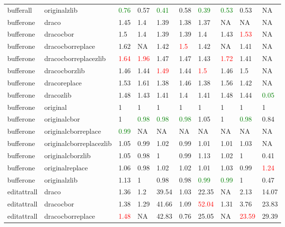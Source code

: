 \begin{landscape}
\begin{longtable}{llllllllll}
bufferall & originalzlib & \textcolor{green}{0.76} & 0.57 & \textcolor{green}{0.41} & 0.58 & \textcolor{green}{0.39} & \textcolor{green}{0.53} & 0.53 & NA\\
bufferone & draco & 1.45 & 1.4 & 1.39 & 1.38 & 1.37 & NA & NA & NA\\
bufferone & dracocbor & 1.5 & 1.4 & 1.39 & 1.39 & 1.4 & 1.43 & \textcolor{red}{1.53} & NA\\
bufferone & dracocborreplace & 1.62 & NA & 1.42 & \textcolor{red}{1.5} & 1.42 & NA & 1.41 & NA\\
bufferone & dracocborreplacezlib & \textcolor{red}{1.64} & \textcolor{red}{1.96} & 1.47 & 1.47 & 1.43 & \textcolor{red}{1.72} & 1.41 & NA\\
bufferone & dracocborzlib & 1.46 & 1.44 & \textcolor{red}{1.49} & 1.44 & \textcolor{red}{1.5} & 1.46 & 1.5 & NA\\
bufferone & dracoreplace & 1.53 & 1.61 & 1.38 & 1.46 & 1.38 & 1.56 & 1.42 & NA\\
bufferone & dracozlib & 1.48 & 1.43 & 1.41 & 1.4 & 1.41 & 1.48 & 1.44 & \textcolor{green}{0.05}\\
bufferone & original & 1 & 1 & 1 & 1 & 1 & 1 & 1 & 1\\
bufferone & originalcbor & 1 & \textcolor{green}{0.98} & \textcolor{green}{0.98} & \textcolor{green}{0.98} & 1.05 & 1 & \textcolor{green}{0.98} & 0.84\\
bufferone & originalcborreplace & \textcolor{green}{0.99} & NA & NA & NA & NA & NA & NA & NA\\
bufferone & originalcborreplacezlib & 1.05 & 0.99 & 1.02 & 0.99 & 1.01 & 1.01 & 1.03 & NA\\
bufferone & originalcborzlib & 1.05 & 0.98 & 1 & 0.99 & 1.13 & 1.02 & 1 & 0.41\\
\rowcolor{lightgray}  bufferone & originalreplace & 1.06 & 0.98 & 1.02 & 1.02 & 1.01 & 1.03 & 0.99 & \textcolor{red}{1.24}\\
\rowcolor{lightgray}  bufferone & originalzlib & 1.13 & 1 & 0.98 & 0.98 & \textcolor{green}{0.99} & \textcolor{green}{0.99} & 1 & 0.47\\
\rowcolor{lightgray}  editattrall & draco & 1.36 & 1.2 & 39.54 & 1.03 & 22.35 & NA & 2.13 & 14.07\\
\rowcolor{lightgray}  editattrall & dracocbor & 1.38 & 1.29 & 41.66 & 1.09 & \textcolor{red}{52.04} & 1.31 & 3.76 & 23.83\\
\rowcolor{lightgray}  editattrall & dracocborreplace & \textcolor{red}{1.48} & NA & 42.83 & 0.76 & 25.05 & NA & \textcolor{red}{23.59} & 29.39\\

\end{longtable}
\end{landscape}
